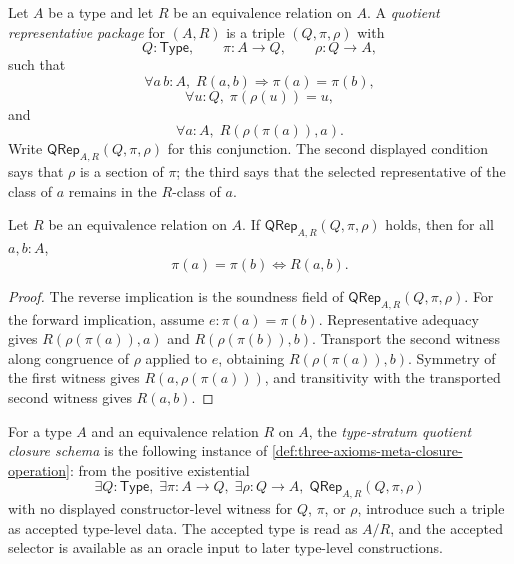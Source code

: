 \begin{definition}
\label{def:quotient-representative-package}
Let $A$ be a type and let $R$ be an equivalence relation on $A$. A \emph{quotient representative package} for $(A,R)$ is a triple $(Q,\pi,\rho)$ with
$$
Q:\mathsf{Type},\qquad \pi:A\to Q,\qquad \rho:Q\to A,
$$
such that
$$
\forall a\,b:A,\; R(a,b)\Longrightarrow \pi(a)=\pi(b),
$$
$$
\forall u:Q,\; \pi(\rho(u))=u,
$$
and
$$
\forall a:A,\; R(\rho(\pi(a)),a).
$$
Write $\mathsf{QRep}_{A,R}(Q,\pi,\rho)$ for this conjunction. The second displayed condition says that $\rho$ is a section of $\pi$; the third says that the selected representative of the class of $a$ remains in the $R$-class of $a$.
\end{definition}

\begin{lemma}
\label{lem:quotient-representative-package-exact}
Let $R$ be an equivalence relation on $A$. If $\mathsf{QRep}_{A,R}(Q,\pi,\rho)$ holds, then for all $a,b:A$,
$$
\pi(a)=\pi(b)\Longleftrightarrow R(a,b).
$$
\end{lemma}

\begin{proof}
The reverse implication is the soundness field of $\mathsf{QRep}_{A,R}(Q,\pi,\rho)$. For the forward implication, assume $e:\pi(a)=\pi(b)$. Representative adequacy gives $R(\rho(\pi(a)),a)$ and $R(\rho(\pi(b)),b)$. Transport the second witness along congruence of $\rho$ applied to $e$, obtaining $R(\rho(\pi(a)),b)$. Symmetry of the first witness gives $R(a,\rho(\pi(a)))$, and transitivity with the transported second witness gives $R(a,b)$.
\end{proof}

\begin{definition}
\label{def:type-stratum-quotient-closure}
For a type $A$ and an equivalence relation $R$ on $A$, the \emph{type-stratum quotient closure schema} is the following instance of \autoref{def:three-axioms-meta-closure-operation}: from the positive existential
$$
\exists Q:\mathsf{Type},\;\exists \pi:A\to Q,\;\exists \rho:Q\to A,\;\mathsf{QRep}_{A,R}(Q,\pi,\rho)
$$
with no displayed constructor-level witness for $Q$, $\pi$, or $\rho$, introduce such a triple as accepted type-level data. The accepted type is read as $A/R$, and the accepted selector is available as an oracle input to later type-level constructions.
\end{definition}

